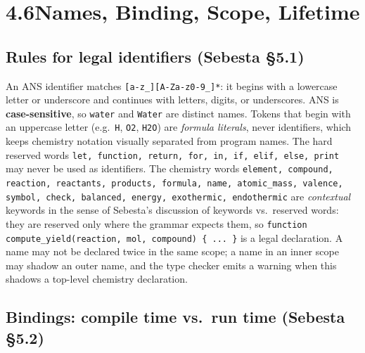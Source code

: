 \documentclass[11pt,a4paper]{article}
\newcommand{\code}[1]{\texttt{#1}}
\begin{document}
\newpage
\section{4.6\quad Names, Binding, Scope, Lifetime}

\subsection{Rules for legal identifiers (Sebesta \S5.1)}

An ANS identifier matches \code{[a-z\_][A-Za-z0-9\_]*}: it begins with a
lowercase letter or underscore and continues with letters, digits, or
underscores. ANS is \textbf{case-sensitive}, so \code{water} and \code{Water}
are distinct names. Tokens that begin with an uppercase letter (e.g.\
\code{H}, \code{O2}, \code{H2O}) are \textit{formula literals}, never
identifiers, which keeps chemistry notation visually separated from program
names. The hard reserved words \code{let, function, return, for, in, if,
elif, else, print} may never be used as identifiers. The chemistry words
\code{element, compound, reaction, reactants, products, formula, name,
atomic\_mass, valence, symbol, check, balanced, energy, exothermic,
endothermic} are \textit{contextual} keywords in the sense of Sebesta's
discussion of keywords vs.\ reserved words: they are reserved only where the
grammar expects them, so
\code{function compute\_yield(reaction, mol, compound) \{ ... \}} is a legal
declaration. A name may not be declared twice in the same scope; a name in
an inner scope may shadow an outer name, and the type checker emits a warning
when this shadows a top-level chemistry declaration.

\subsection{Bindings: compile time vs.\ run time (Sebesta \S5.2)}
\end{document}
